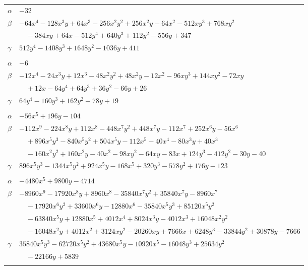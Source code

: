 \documentclass[11pt]{article}
\begin{document}
\begin{longtable}{@{}ll@{}}
$\alpha$ & $-32$\\
$\beta$ & $-64x^{4}-128x^{3}y+64x^{3}-256x^{2}y^{2}+256x^{2}y-64x^{2}-512xy^{3}+768xy^{2}$\\
 & $\quad -384xy+64x-512y^{4}+640y^{3}+112y^{2}-556y+347$\\
$\gamma$ & $512y^{4}-1408y^{3}+1648y^{2}-1036y+411$\\
\addlinespace[3pt]
\multicolumn{2}{@{}l}{$\{i,j\}=\{6,13\}$, $k_{ij}=2\cdot 3^{2}$}\\
$\alpha$ & $-6$\\
$\beta$ & $-12x^{4}-24x^{3}y+12x^{3}-48x^{2}y^{2}+48x^{2}y-12x^{2}-96xy^{3}+144xy^{2}-72xy$\\
 & $\quad +12x-64y^{4}+64y^{3}+36y^{2}-66y+26$\\
$\gamma$ & $64y^{4}-160y^{3}+162y^{2}-78y+19$\\
\addlinespace[3pt]
\multicolumn{2}{@{}l}{$\{i,j\}=\{6,16\}$, $k_{ij}=2^{4}\cdot 3^{2}$}\\
$\alpha$ & $-56x^{5}+196y-104$\\
$\beta$ & $-112x^{9}-224x^{8}y+112x^{8}-448x^{7}y^{2}+448x^{7}y-112x^{7}+252x^{6}y-56x^{6}$\\
 & $\quad +896x^{5}y^{3}-840x^{5}y^{2}+504x^{5}y-112x^{5}-40x^{4}-80x^{3}y+40x^{3}$\\
 & $\quad -160x^{2}y^{2}+160x^{2}y-40x^{2}-98xy^{2}-64xy-83x+124y^{3}-412y^{2}-30y-40$\\
$\gamma$ & $896x^{5}y^{3}-1344x^{5}y^{2}+924x^{5}y-168x^{5}+320y^{3}-578y^{2}+176y-123$\\
\addlinespace[3pt]
\multicolumn{2}{@{}l}{$\{i,j\}=\{6,28\}$, $k_{ij}=2\cdot 3^{3}\cdot 13$}\\
$\alpha$ & $-4480x^{5}+9800y-4714$\\
$\beta$ & $-8960x^{9}-17920x^{8}y+8960x^{8}-35840x^{7}y^{2}+35840x^{7}y-8960x^{7}$\\
 & $\quad -17920x^{6}y^{2}+33600x^{6}y-12880x^{6}-35840x^{5}y^{3}+85120x^{5}y^{2}$\\
 & $\quad -63840x^{5}y+12880x^{5}+4012x^{4}+8024x^{3}y-4012x^{3}+16048x^{2}y^{2}$\\
 & $\quad -16048x^{2}y+4012x^{2}+3124xy^{2}-20260xy+7666x+6248y^{3}-33844y^{2}+30878y-7666$\\
$\gamma$ & $35840x^{5}y^{3}-62720x^{5}y^{2}+43680x^{5}y-10920x^{5}-16048y^{3}+25634y^{2}$\\
 & $\quad -22166y+5839$\\
\addlinespace[3pt]
\multicolumn{2}{@{}l}{$\{i,j\}=\{6,33\}$, $k_{ij}=3^{2}\cdot 13^{2}$}\\

\end{longtable}
\end{document}
